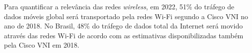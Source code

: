 


Para quantificar a relevância das redes \textit{wireless}, em 2022, 51\% do tráfego de dados móveis global será transportado pela redes Wi-Fi segundo a Cisco VNI no ano de 2018. No Brasil, 48\% do tráfego de dados total da Internet será movido através das redes Wi-Fi de acordo com as estimativas disponibilizadas também pela Cisco VNI em 2018.


